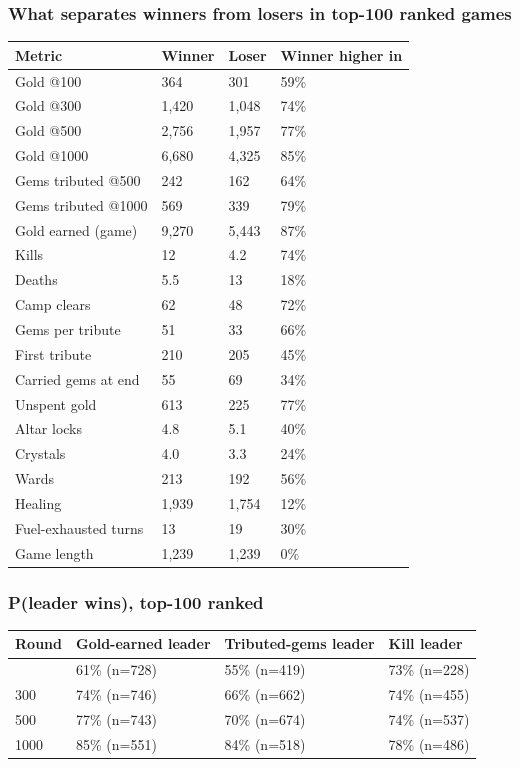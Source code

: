 \documentclass[
  10pt,
]{article}
\newcounter{none} %
\begin{document}
\subsubsection{What separates winners from losers in top-100 ranked
games}\label{what-separates-winners-from-losers-in-top-100-ranked-games}

{\def\LTcaptype{none} %
\begin{longtable}[]{@{}llll@{}}
\toprule\noalign{}
Metric & Winner & Loser & Winner higher in \\
\midrule\noalign{}
\endhead
\bottomrule\noalign{}
\endlastfoot
Gold @100 & 364 & 301 & 59\% \\
Gold @300 & 1,420 & 1,048 & 74\% \\
Gold @500 & 2,756 & 1,957 & 77\% \\
Gold @1000 & 6,680 & 4,325 & 85\% \\
Gems tributed @500 & 242 & 162 & 64\% \\
Gems tributed @1000 & 569 & 339 & 79\% \\
Gold earned (game) & 9,270 & 5,443 & 87\% \\
Kills & 12 & 4.2 & 74\% \\
Deaths & 5.5 & 13 & 18\% \\
Camp clears & 62 & 48 & 72\% \\
Gems per tribute & 51 & 33 & 66\% \\
First tribute & 210 & 205 & 45\% \\
Carried gems at end & 55 & 69 & 34\% \\
Unspent gold & 613 & 225 & 77\% \\
Altar locks & 4.8 & 5.1 & 40\% \\
Crystals & 4.0 & 3.3 & 24\% \\
Wards & 213 & 192 & 56\% \\
Healing & 1,939 & 1,754 & 12\% \\
Fuel-exhausted turns & 13 & 19 & 30\% \\
Game length & 1,239 & 1,239 & 0\% \\
\end{longtable}
}

\subsubsection{P(leader wins), top-100
ranked}\label{pleader-wins-top-100-ranked}

{\def\LTcaptype{none} %
\begin{longtable}[]{@{}llll@{}}
\toprule\noalign{}
Round & Gold-earned leader & Tributed-gems leader & Kill leader \\
\midrule\noalign{}
\endhead
\bottomrule\noalign{}
\endlastfoot
100 & 61\% (n=728) & 55\% (n=419) & 73\% (n=228) \\
300 & 74\% (n=746) & 66\% (n=662) & 74\% (n=455) \\
500 & 77\% (n=743) & 70\% (n=674) & 74\% (n=537) \\
1000 & 85\% (n=551) & 84\% (n=518) & 78\% (n=486) \\
\end{longtable}
}
\end{document}
